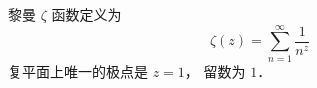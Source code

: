 
\begin{issues}
\issueDraft
\end{issues}

黎曼 $\zeta$ 函数定义为
\begin{equation}
\zeta(z) = \sum_{n=1}^\infty \frac{1}{n^z}
\end{equation}
复平面上唯一的极点是 $z = 1$， 留数为 $1$．
